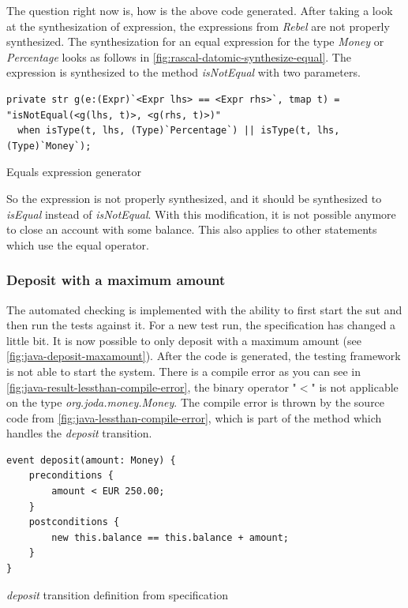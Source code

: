 The question right now is, how is the above code generated. After taking a look at the synthesization of
expression, the expressions from \textit{Rebel} are not properly synthesized. The
synthesization for an equal expression for the type \textit{Money} or \textit{Percentage} looks as
follows in \autoref{fig:rascal-datomic-synthesize-equal}. The expression is
synthesized to the method \textit{isNotEqual} with two parameters.

\begin{sourcecode}[h!]
\begin{lstlisting}[]
private str g(e:(Expr)`<Expr lhs> == <Expr rhs>`, tmap t) = "isNotEqual(<g(lhs, t)>, <g(rhs, t)>)"
  when isType(t, lhs, (Type)`Percentage`) || isType(t, lhs, (Type)`Money`);
\end{lstlisting}
\caption{Equals expression generator}\label{fig:rascal-datomic-synthesize-equal}
\end{sourcecode}
\FloatBarrier

So the expression is not properly synthesized, and it should be synthesized to
\textit{isEqual} instead of \textit{isNotEqual}. With this modification, it
is not possible anymore to close an account with some balance. This also applies
to other statements which use the equal operator.

\subsubsection{Deposit with a maximum amount}\label{sec:bug-compile-max-deposit}

The automated checking is implemented with the ability to first start the
\gls{sut} and then run the tests against it. For a new test run, the
specification has changed a little bit. It is now possible to only deposit with
a maximum amount (see \autoref{fig:java-deposit-maxamount}). After the code is
generated, the testing framework is not able to start the system. There is a
compile error as you can see in
\autoref{fig:java-result-lessthan-compile-error}, the binary operator "$<$"
is not applicable on the type \textit{org.joda.money.Money}. The compile error
is thrown by the source code from \autoref{fig:java-lessthan-compile-error},
which is part of the method which handles the \textit{deposit} transition.

\begin{sourcecode}[h!]
\begin{lstlisting}[]
event deposit(amount: Money) {
	preconditions {
		amount < EUR 250.00;
	}
	postconditions {
		new this.balance == this.balance + amount;
	}
}
\end{lstlisting}
\caption{\textit{deposit} transition definition from specification}\label{fig:java-deposit-maxamount}
\end{sourcecode}
\FloatBarrier

